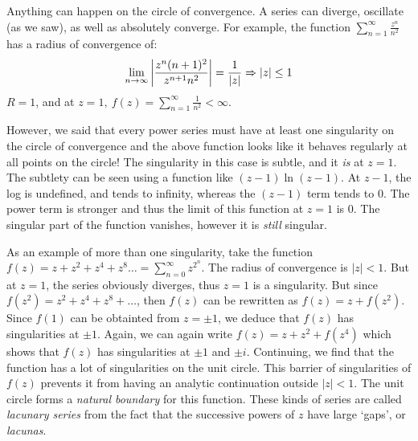 \documentclass[12pt, letterpaper]{book}
\begin{document}
Anything can happen on the circle of convergence. A series can diverge, oscillate (as we saw), as well as absolutely converge. For example, the function $\sum_{n=1}^{\infty} \frac{z^n}{n^2}$ has a radius of convergence of: $$\lim_{n\to\infty}\qty|\frac{z^n (n+1)^2}{z^{n+1} n^2}|= \frac{1}{|z|}\Rightarrow |z|\leq 1$$
$R= 1$, and at $z= 1, \ f(z)= \sum_{n=1}^{\infty} \frac{1}{n^2}<\infty$. 

However, we said that every power series must have at least one singularity on the circle of convergence and the above function looks like it behaves regularly at all points on the circle! The singularity in this case is subtle, and it \emph{is} at $z= 1$. The subtlety can be seen using a function like $(z-1)\ln(z-1)$. At $z-1$, the log is undefined, and tends to infinity, whereas the $(z-1)$ term tends to $0$. The power term is stronger and thus the limit of this function at $z=1$ is $0$. The singular part of the function vanishes, however it is \emph{still} singular. 

As an example of more than one singularity, take the function $f(z)= z+ z^2 + z^4 + z^8\dots= \sum_{n=0}^{\infty} z^{2^n}$. The radius of convergence is $|z|<1$. But at $z=1$, the series obviously diverges, thus $z=1$ is a singularity. But since $f(z^2)= z^2+ z^4+ z^8+\dots$, then $f(z)$ can be rewritten as $f(z)= z+ f(z^2)$. Since $f(1)$ can be obtainted from $z=\pm 1$, we deduce that $f(z)$ has singularities at $\pm 1$. Again, we can again write $f(z)= z+ z^2 + f(z^4)$ which shows that $f(z)$ has singularities at $\pm 1$ and $\pm i$. Continuing, we find that the function has a lot of singularities on the unit circle. This barrier of singularities of $f(z)$ prevents it from having an analytic continuation outside $|z|<1$. The unit circle forms a \emph{natural boundary} for this function. These kinds of series are called \emph{lacunary series} from the fact that the successive powers of $z$ have large `gaps', or \emph{lacunas}. 
\end{document}
